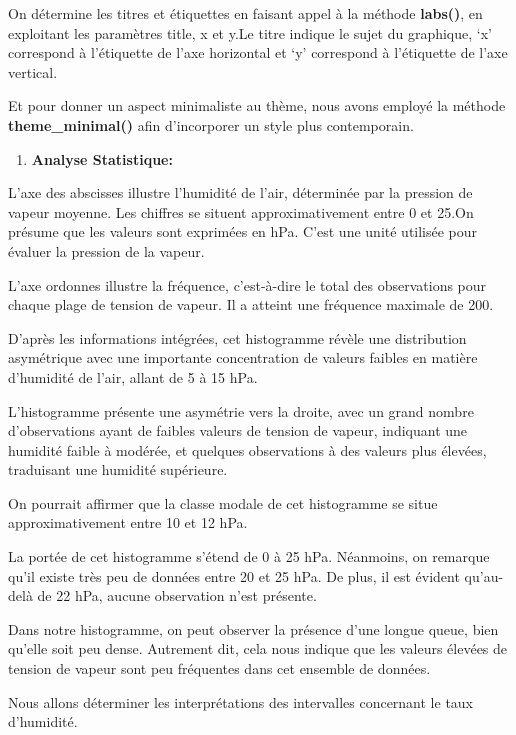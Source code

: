 \documentclass[
]{article}
\providecommand{\tightlist}{%
  \setlength{\itemsep}{0pt}\setlength{\parskip}{0pt}}
\begin{document}
On détermine les titres et étiquettes en faisant appel à la méthode
\textbf{labs()}, en exploitant les paramètres title, x et y.Le titre
indique le sujet du graphique, `x' correspond à l'étiquette de l'axe
horizontal et `y' correspond à l'étiquette de l'axe vertical.

Et pour donner un aspect minimaliste au thème, nous avons employé la
méthode \textbf{theme\_minimal()} afin d'incorporer un style plus
contemporain.

\begin{enumerate}
\def\labelenumi{\arabic{enumi}.}
\setcounter{enumi}{1}
\tightlist
\item
  \textbf{Analyse Statistique:}
\end{enumerate}

L'axe des abscisses illustre l'humidité de l'air, déterminée par la
pression de vapeur moyenne. Les chiffres se situent approximativement
entre 0 et 25.On présume que les valeurs sont exprimées en hPa. C'est
une unité utilisée pour évaluer la pression de la vapeur.

L'axe ordonnes illustre la fréquence, c'est-à-dire le total des
observations pour chaque plage de tension de vapeur. Il a atteint une
fréquence maximale de 200.

D'après les informations intégrées, cet histogramme révèle une
distribution asymétrique avec une importante concentration de valeurs
faibles en matière d'humidité de l'air, allant de 5 à 15 hPa.

L'histogramme présente une asymétrie vers la droite, avec un grand
nombre d'observations ayant de faibles valeurs de tension de vapeur,
indiquant une humidité faible à modérée, et quelques observations à des
valeurs plus élevées, traduisant une humidité supérieure.

On pourrait affirmer que la classe modale de cet histogramme se situe
approximativement entre 10 et 12 hPa.

La portée de cet histogramme s'étend de 0 à 25 hPa. Néanmoins, on
remarque qu'il existe très peu de données entre 20 et 25 hPa. De plus,
il est évident qu'au-delà de 22 hPa, aucune observation n'est présente.

Dans notre histogramme, on peut observer la présence d'une longue queue,
bien qu'elle soit peu dense. Autrement dit, cela nous indique que les
valeurs élevées de tension de vapeur sont peu fréquentes dans cet
ensemble de données.

Nous allons déterminer les interprétations des intervalles concernant le
taux d'humidité.
\end{document}

